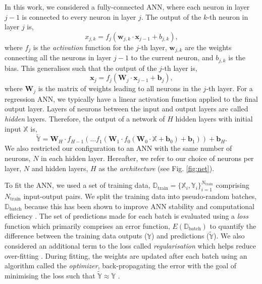 In this work, we considered a fully-connected ANN, where each neuron in layer $j-1$ is connected to every neuron in layer $j$. The output of the $k$-th neuron in layer $j$ is, 
%
\begin{equation}
    x_{j, k}=f_j(\boldsymbol{w}_{j, k} \cdot \boldsymbol{x}_{j-1} + b_{j, k}),
\end{equation}
%
where $f_j$ is the \emph{activation} function for the $j$-th layer, $\boldsymbol{w}_{j, k}$ are the weights connecting all the neurons in layer $j-1$ to the current neuron, and $b_{j, k}$ is the bias. This generalises such that the output of the $j$-th layer is,
%
\begin{equation}
    \boldsymbol{x}_{j}=f_j(\boldsymbol{W}_{j} \cdot \boldsymbol{x}_{j-1} + \boldsymbol{b}_{j}),
\end{equation}
%
where $\boldsymbol{W}_j$ is the matrix of weights leading to all neurons in the $j$-th layer. For a regression ANN, we typically have a linear activation function applied to the final output layer. Layers of neurons between the input and output layers are called \emph{hidden} layers. Therefore, the output of a network of $H$ hidden layers with initial input $\boldsymbol{\mathbb{X}}$ is,
%
\begin{equation}
    \widetilde{\boldsymbol{\mathbb{Y}}} = \boldsymbol{W}_{H} \cdot f_{H-1}(\dots f_1(\boldsymbol{W}_1 \cdot f_0(\boldsymbol{W}_{0} \cdot \boldsymbol{\mathbb{X}} + \boldsymbol{b}_{0}) + \boldsymbol{b}_1) ) + \boldsymbol{b}_{H}.
\end{equation}
%
We also restricted our configuration to an ANN with the same number of neurons, $N$ in each hidden layer. Hereafter, we refer to our choice of neurons per layer, $N$ and hidden layers, $H$ as the \emph{architecture} (see Fig. \ref{fig:net}).

To fit the ANN, we used a set of training data, $\boldsymbol{\mathbb{D}}_\mathrm{train} = \{\boldsymbol{\mathbb{X}}_i, \boldsymbol{\mathbb{Y}}_i\}_{i=1}^{N_\mathrm{train}}$ comprising $N_\mathrm{train}$ input-output pairs. We split the training data into pseudo-random batches, $\boldsymbol{\mathbb{D}}_\mathrm{batch}$ because this has been shown to improve ANN stability and computational efficiency \citep{Masters.Luschi2018}. The set of predictions made for each batch is evaluated using a \emph{loss} function which primarily comprises an error function, $E(\boldsymbol{\mathbb{D}}_\mathrm{batch})$ to quantify the difference between the training data outputs ($\boldsymbol{\mathbb{Y}}$) and predictions ($\widetilde{\boldsymbol{\mathbb{Y}}}$). We also considered an additional term to the loss called \emph{regularisation} which helps reduce over-fitting \citep{Goodfellow.Bengio.ea2016}. During fitting, the weights are updated after each batch using an algorithm called the \emph{optimizer}, back-propagating the error with the goal of minimising the loss such that $\widetilde{\boldsymbol{\mathbb{Y}}} \approx \boldsymbol{\mathbb{Y}}$ \citep[see e.g.][]{Rumelhart.Hinton.ea1986}.

